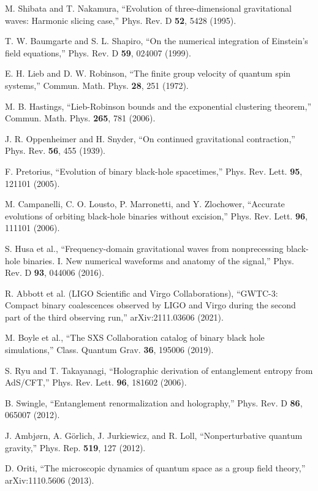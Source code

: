 \documentclass[11pt,a4paper]{article}
\begin{document}
\begin{thebibliography}{99}

M. Shibata and T. Nakamura, ``Evolution of three-dimensional gravitational waves: Harmonic slicing case,'' Phys. Rev. D \textbf{52}, 5428 (1995).

T. W. Baumgarte and S. L. Shapiro, ``On the numerical integration of Einstein's field equations,'' Phys. Rev. D \textbf{59}, 024007 (1999).

E. H. Lieb and D. W. Robinson, ``The finite group velocity of quantum spin systems,'' Commun. Math. Phys. \textbf{28}, 251 (1972).

M. B. Hastings, ``Lieb-Robinson bounds and the exponential clustering theorem,'' Commun. Math. Phys. \textbf{265}, 781 (2006).

J. R. Oppenheimer and H. Snyder, ``On continued gravitational contraction,'' Phys. Rev. \textbf{56}, 455 (1939).

F. Pretorius, ``Evolution of binary black-hole spacetimes,'' Phys. Rev. Lett. \textbf{95}, 121101 (2005).

M. Campanelli, C. O. Lousto, P. Marronetti, and Y. Zlochower, ``Accurate evolutions of orbiting black-hole binaries without excision,'' Phys. Rev. Lett. \textbf{96}, 111101 (2006).

S. Husa et al., ``Frequency-domain gravitational waves from nonprecessing black-hole binaries. I. New numerical waveforms and anatomy of the signal,'' Phys. Rev. D \textbf{93}, 044006 (2016).

R. Abbott et al. (LIGO Scientific and Virgo Collaborations), ``GWTC-3: Compact binary coalescences observed by LIGO and Virgo during the second part of the third observing run,'' arXiv:2111.03606 (2021).

M. Boyle et al., ``The SXS Collaboration catalog of binary black hole simulations,'' Class. Quantum Grav. \textbf{36}, 195006 (2019).

S. Ryu and T. Takayanagi, ``Holographic derivation of entanglement entropy from AdS/CFT,'' Phys. Rev. Lett. \textbf{96}, 181602 (2006).

B. Swingle, ``Entanglement renormalization and holography,'' Phys. Rev. D \textbf{86}, 065007 (2012).

J. Ambjørn, A. Görlich, J. Jurkiewicz, and R. Loll, ``Nonperturbative quantum gravity,'' Phys. Rep. \textbf{519}, 127 (2012).

D. Oriti, ``The microscopic dynamics of quantum space as a group field theory,'' arXiv:1110.5606 (2013).

\end{thebibliography}
\end{document}
